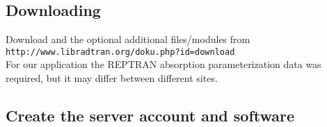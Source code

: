 \subsection{Downloading  \libradtran{}}

Download \libradtran{} and the optional additional files/modules from\\
\lstinline{http://www.libradtran.org/doku.php?id=download}\\
For our application the REPTRAN absorption parameterization data was required, but it may differ between different sites.




\subsection{Create the server account and software}

